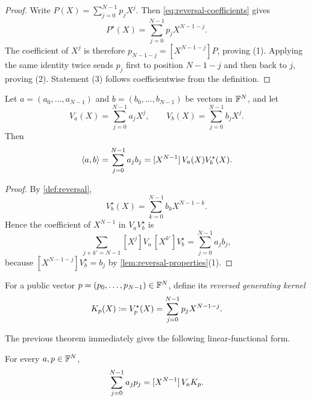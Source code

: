 \begin{proof}
Write $P(X)=\sum_{j=0}^{N-1}p_jX^j$.  Then \eqref{eq:reversal-coefficients} gives
\[
  P^{\star}(X)=\sum_{j=0}^{N-1}p_jX^{N-1-j}.
\]
The coefficient of $X^j$ is therefore $p_{N-1-j}=[X^{N-1-j}]P$, proving (1).  Applying the same identity twice sends $p_j$ first to position $N-1-j$ and then back to $j$, proving (2).  Statement (3) follows coefficientwise from the definition.
\end{proof}

\begin{theorem}
\label{thm:middle-coefficient-inner-product}
Let $a=(a_0,\ldots,a_{N-1})$ and $b=(b_0,\ldots,b_{N-1})$ be vectors in $\mathbb{F}^N$, and let
\[
  V_a(X)=\sum_{j=0}^{N-1}a_jX^j,
  \qquad
  V_b(X)=\sum_{j=0}^{N-1}b_jX^j.
\]
Then
\begin{equation}
  \left\langle a,b\right\rangle
  =\sum_{j=0}^{N-1}a_jb_j
  =[X^{N-1}]\,V_a(X)V_b^{\star}(X).
  \label{eq:middle-coefficient-inner-product}
\end{equation}
\end{theorem}

\begin{proof}
By \cref{def:reversal},
\[
  V_b^{\star}(X)=\sum_{k=0}^{N-1}b_kX^{N-1-k}.
\]
Hence the coefficient of $X^{N-1}$ in $V_aV_b^{\star}$ is
\[
  \sum_{j+k'=N-1} [X^j]V_a\,[X^{k'}]V_b^{\star}
  =\sum_{j=0}^{N-1}a_jb_j,
\]
because $[X^{N-1-j}]V_b^{\star}=b_j$ by \cref{lem:reversal-properties}(1).
\end{proof}

\begin{definition}
\label{def:public-kernel}
For a public vector $p=(p_0,\ldots,p_{N-1})\in\mathbb{F}^N$, define its \emph{reversed generating kernel}
\begin{equation}
  K_p(X)
  \coloneqq
  V_p^{\star}(X)
  =\sum_{j=0}^{N-1}p_jX^{N-1-j}.
  \label{eq:public-kernel}
\end{equation}
\end{definition}

The previous theorem immediately gives the following linear-functional form.

\begin{corollary}
\label{cor:public-linear-functional}
For every $a,p\in\mathbb{F}^N$,
\begin{equation}
  \sum_{j=0}^{N-1}a_jp_j
  =[X^{N-1}]\,V_aK_p.
  \label{eq:public-linear-functional}
\end{equation}
\end{corollary}

